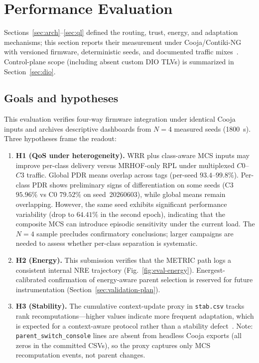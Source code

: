 \section{Performance Evaluation}
\label{sec:eval}

Sections~\ref{sec:arch}--\ref{sec:ql} defined the routing, trust, energy, and adaptation mechanisms; this section reports their measurement under Cooja/Contiki-NG with versioned firmware, deterministic seeds, and documented traffic mixes~\cite{osterlind2006cooja,oikonomou2022contik}. Control-plane scope (including absent custom DIO TLVs) is summarized in Section~\ref{sec:dio}.

\subsection{Goals and hypotheses}
This evaluation verifies four-way firmware integration under identical Cooja inputs and archives descriptive dashboards from $N{=}4$ measured seeds (1800~s). Three hypotheses frame the readout:
\begin{enumerate}
  \item \textbf{H1 (QoS under heterogeneity).} WRR plus class-aware MCS inputs may improve per-class delivery versus MRHOF-only RPL under multiplexed $C0$--$C3$ traffic. Global PDR means overlap across tags (per-seed $93.4$--$99.8\%$). Per-class PDR shows preliminary signs of differentiation on some seeds (C3 $95.96\%$ vs C0 $79.52\%$ on seed~20260603), while global means remain overlapping. However, the same seed exhibits significant performance variability (drop to $64.41\%$ in the second epoch), indicating that the composite MCS can introduce episodic sensitivity under the current load. The $N{=}4$ sample precludes confirmatory conclusions; larger campaigns are needed to assess whether per-class separation is systematic.
  \item \textbf{H2 (Energy).} This submission verifies that the METRIC path logs a consistent internal NRE trajectory (Fig.~\ref{fig:eval-energy}). Energest-calibrated confirmation of energy-aware parent selection is reserved for future instrumentation (Section~\ref{sec:validation-plan}).
  \item \textbf{H3 (Stability).} The cumulative context-update proxy in \texttt{stab.csv} tracks rank recomputations---higher values indicate more frequent adaptation, which is expected for a context-aware protocol rather than a stability defect~\cite{rfc6719}. Note: \texttt{parent\_switch\_console} lines are absent from headless Cooja exports (all zeros in the committed CSVs), so the proxy captures only MCS recomputation events, not parent changes.
\end{enumerate}

